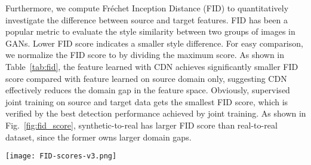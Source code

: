\documentclass[runningheads]{llncs}
\begin{document}
Furthermore, we compute Fréchet Inception Distance (FID)\cite{heusel2017gans} to quantitatively investigate the difference between source and target features.
FID has been a popular metric to evaluate the style similarity between two groups of images in GANs.
Lower FID score indicates a smaller style difference.
For easy comparison, we normalize the FID score to  by dividing the maximum score.
As shown in Table~\ref{tab:fid}, the feature learned with CDN achieves significantly smaller FID score compared with feature learned on source domain only, suggesting CDN effectively reduces the domain gap in the feature space.
Obviously, supervised joint training on source and target data gets the smallest FID score, which is verified by the best detection performance achieved by joint training.
As shown in Fig.~\ref{fig:fid_score}, synthetic-to-real has larger FID score than real-to-real dataset, since the former owns larger domain gaps.
\vspace{3pt}


\begin{minipage}{\textwidth}
  \hspace{-0.5cm} \begin{minipage}[]{0.48\textwidth}
    \centering
    \label{tab:fid}
    \end{minipage}
    \hfill
    \hspace{-0.55cm} \begin{minipage}[]{0.52\textwidth}
    \centering
    \texttt{[image: FID-scores-v3.png]}
    \vspace{-10pt}
    \label{fig:fid_score}
  \end{minipage}
\end{minipage}
\end{document}
